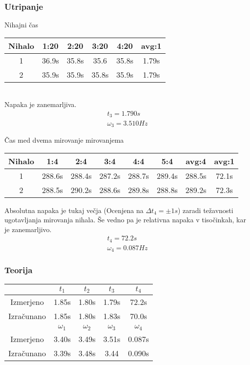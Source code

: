 \documentclass[a4paper]{article}
\begin{document}
\subsubsection{Utripanje}
Nihajni čas
\begin{table}[h]
  \centering
\begin{tabular}{*{6}{c}}
  Nihalo & 1:20 & 2:20 & 3:20 & 4:20 & avg:1\\\toprule
  1 & 36.9s & 35.8s & 35.6 & 35.8s & 1.79s \\\midrule
  2 & 35.9s & 35.9s & 35.8s & 35.9s & 1.79s \\\bottomrule
\end{tabular}
\end{table}\\
Napaka je zanemarljiva.
\begin{align*}
  t_3=1.790s\\
  \omega_3=3.510Hz
\end{align*}

Čas med dvema mirovanje mirovanjema
\begin{table}[h]
  \centering
  \begin{tabular}{*{8}{c}}
    Nihalo & 1:4 & 2:4 & 3:4 & 4:4 & 5:4 & avg:4 & avg:1 \\\toprule
    1 & 288.6s & 288.4s & 287.2s & 288.7s & 289.4s & 288.5s & 72.1s\\\midrule
    2 & 288.5s & 290.2s & 288.6s & 289.8s & 288.8s & 289.2s & 72.3s \\\bottomrule
  \end{tabular}
\end{table}
Absolutna napaka je tukaj večja (Ocenjena na \(\Delta t_4 = \pm 1s\)) zaradi težavnosti ugotavljanja mirovanja nihala. Še vedno pa je relativna napaka v tisočinkah, kar je zanemarljivo.
\begin{align*}
  t_4 = 72.2s\\
  \omega_4 = 0.087Hz
\end{align*}
\subsubsection{Teorija}
\begin{table}[h]
  \centering
  \begin{tabular}{*{5}{c}}\toprule
    & $t_1$ & $t_2$ & $t_3$ & $t_4$ \\\midrule
    Izmerjeno & 1.85s & 1.80s & 1.79s & 72.2s \\
    Izračunano & 1.85s & 1.80s & 1.83s & 70.0s\\\toprule
    & $\omega_1$ & $\omega_2$ & $\omega_3$ & $\omega_4$ \\\midrule
    Izmerjeno & 3.40s & 3.49s & 3.51s & 0.087s \\
    Izračunano & 3.39s & 3.48s & 3.44 & 0.090s \\\bottomrule
  \end{tabular}
\end{table}
\end{document}
